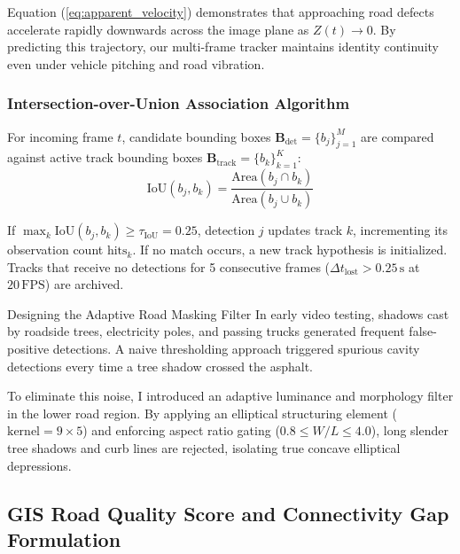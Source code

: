 Equation (\ref{eq:apparent_velocity}) demonstrates that approaching road defects accelerate rapidly downwards across the image plane as $Z(t) \to 0$. By predicting this trajectory, our multi-frame tracker maintains identity continuity even under vehicle pitching and road vibration.

\subsubsection{Intersection-over-Union Association Algorithm}
For incoming frame $t$, candidate bounding boxes $\mathbf{B}_{\text{det}} = \{b_j\}_{j=1}^M$ are compared against active track bounding boxes $\mathbf{B}_{\text{track}} = \{b_k\}_{k=1}^K$:
\begin{equation}
    \text{IoU}(b_j, b_k) = \frac{\text{Area}(b_j \cap b_k)}{\text{Area}(b_j \cup b_k)}
\end{equation}

If $\max_k \text{IoU}(b_j, b_k) \ge \tau_{\text{IoU}} = 0.25$, detection $j$ updates track $k$, incrementing its observation count $\text{hits}_k$. If no match occurs, a new track hypothesis is initialized. Tracks that receive no detections for 5 consecutive frames ($\Delta t_{\text{lost}} > 0.25\,\text{s}$ at $20\,\text{FPS}$) are archived.

\begin{designreflection}{Designing the Adaptive Road Masking Filter}
In early video testing, shadows cast by roadside trees, electricity poles, and passing trucks generated frequent false-positive detections. A naive thresholding approach triggered spurious cavity detections every time a tree shadow crossed the asphalt.

To eliminate this noise, I introduced an adaptive luminance and morphology filter in the lower road region. By applying an elliptical structuring element ($\text{kernel} = 9 \times 5$) and enforcing aspect ratio gating ($0.8 \le W/L \le 4.0$), long slender tree shadows and curb lines are rejected, isolating true concave elliptical depressions.
\end{designreflection}

\subsection{GIS Road Quality Score and Connectivity Gap Formulation}

